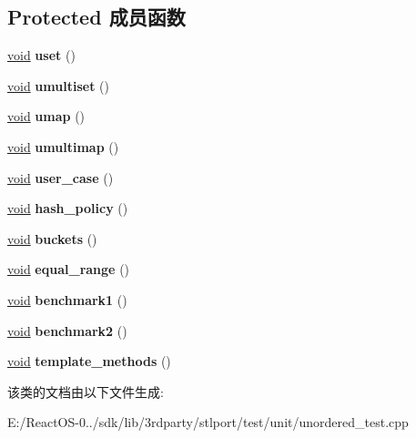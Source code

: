 \subsection*{Protected 成员函数}
\begin{DoxyCompactItemize}
\item 
\mbox{\label{class_unordered_test_a17cdcd8f5903307ebd5afe6cd566889f}} 
\hyperlink{interfacevoid}{void} {\bfseries uset} ()
\item 
\mbox{\label{class_unordered_test_ae4a235311d517984ec4851387a54194d}} 
\hyperlink{interfacevoid}{void} {\bfseries umultiset} ()
\item 
\mbox{\label{class_unordered_test_ab627b9dbff20de846aec2b897df2840b}} 
\hyperlink{interfacevoid}{void} {\bfseries umap} ()
\item 
\mbox{\label{class_unordered_test_a4f43d53bc27a14a240cce2da328b7389}} 
\hyperlink{interfacevoid}{void} {\bfseries umultimap} ()
\item 
\mbox{\label{class_unordered_test_ad405ceccc0d06b047d2f7e43b8228d68}} 
\hyperlink{interfacevoid}{void} {\bfseries user\+\_\+case} ()
\item 
\mbox{\label{class_unordered_test_a6f9cf29d85c3c90be7741287c344c958}} 
\hyperlink{interfacevoid}{void} {\bfseries hash\+\_\+policy} ()
\item 
\mbox{\label{class_unordered_test_a146e2dd1a68cf6317a385ac453e359c8}} 
\hyperlink{interfacevoid}{void} {\bfseries buckets} ()
\item 
\mbox{\label{class_unordered_test_a0421a28b32a62a689662954c19ef23a8}} 
\hyperlink{interfacevoid}{void} {\bfseries equal\+\_\+range} ()
\item 
\mbox{\label{class_unordered_test_a157352d402a2b3e0d922c66a84060426}} 
\hyperlink{interfacevoid}{void} {\bfseries benchmark1} ()
\item 
\mbox{\label{class_unordered_test_af0d6733f384dae2af41b4fd401f247e0}} 
\hyperlink{interfacevoid}{void} {\bfseries benchmark2} ()
\item 
\mbox{\label{class_unordered_test_a50550fcdf1cda678e50941faad487918}} 
\hyperlink{interfacevoid}{void} {\bfseries template\+\_\+methods} ()
\end{DoxyCompactItemize}


该类的文档由以下文件生成\+:\begin{DoxyCompactItemize}
\item 
E\+:/\+React\+O\+S-\/0../sdk/lib/3rdparty/stlport/test/unit/unordered\+\_\+test.\+cpp\end{DoxyCompactItemize}
